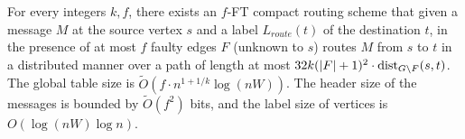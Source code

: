\begin{theorem}
For every integers $k,f$, there exists an $f$-FT compact routing scheme that given a message $M$ at the source vertex $s$ and a label $L_{route}(t)$ of the destination $t$, in the presence of at most $f$ faulty edges $F$ (unknown to $s$) routes $M$ from $s$ to $t$ in a distributed manner over a path of length at most $32k (|F|+1)^2\cdot \mbox{\rm dist}_{G \setminus F}(s,t)$. 
The global table size is $\widetilde{O}(f \cdot n^{1+1/k} \log{(nW)})$.
The header size of the messages is bounded by $\widetilde{O}(f^2)$ bits, and the label size of vertices is $O(\log{(nW)} \log{n})$. 
\end{theorem}


%

